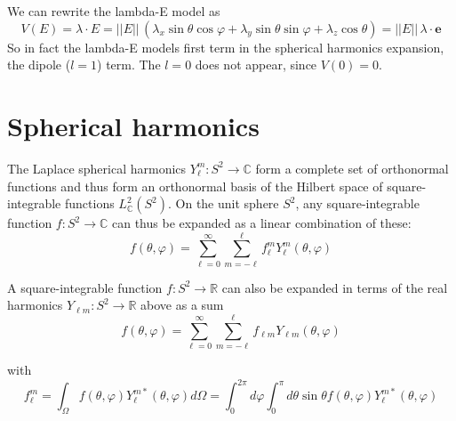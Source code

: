 \documentclass[11pt]{amsart}
\begin{document}
We can rewrite the lambda-E model as
$$
V(E) = \lambda\cdot E =||E||\,  (\lambda_x \sin \theta \cos \varphi+ \lambda_y \sin \theta \sin \varphi+
\lambda_z\cos \theta)= ||E||\, \lambda \cdot \boldsymbol{e} 
$$
So in fact the lambda-E models first term in the spherical harmonics expansion, the dipole ($l=1$) term. The $l=0$ does not appear, since $V(0)=0$.

\section{Spherical harmonics}
The Laplace spherical harmonics $Y_{\ell}^{m}: S^{2} \rightarrow \mathbb{C}$ form a complete set of orthonormal functions and thus form an orthonormal basis of the Hilbert space of square-integrable functions $L_{\mathbb{C}}^{2}\left(S^{2}\right)$. On the unit sphere $S^{2}$, any square-integrable function $f: S^{2} \rightarrow \mathbb{C}$ can thus be expanded as a linear combination of these:
$$
f(\theta, \varphi)=\sum_{\ell=0}^{\infty} \sum_{m=-\ell}^{\ell} f_{\ell}^{m} Y_{\ell}^{m}(\theta, \varphi)
$$


A square-integrable function $f: S^{2} \rightarrow \mathbb{R}$ can also be expanded in terms of the real harmonics $Y_{\ell m}: S^{2} \rightarrow \mathbb{R}$ above as a sum
$$
f(\theta, \varphi)=\sum_{\ell=0}^{\infty} \sum_{m=-\ell}^{\ell} f_{\ell m} Y_{\ell m}(\theta, \varphi)
$$

with
$$
f_{\ell}^{m}=\int_{\Omega} f(\theta, \varphi) Y_{\ell}^{m *}(\theta, \varphi) d \Omega=\int_{0}^{2 \pi} d \varphi \int_{0}^{\pi} d \theta \sin \theta f(\theta, \varphi) Y_{\ell}^{m *}(\theta, \varphi)
$$
\end{document}
